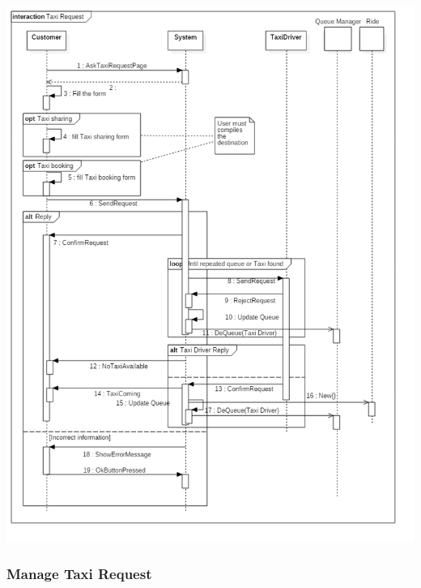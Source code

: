 \documentclass[english]{article}
\begin{document}
\includegraphics[width=\textwidth]{TaxiRequest}


\subsubsection{Manage Taxi Request}
\end{document}
